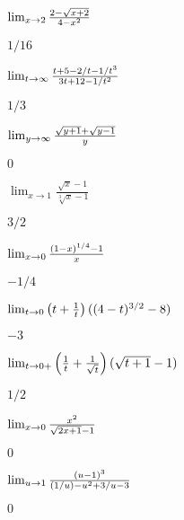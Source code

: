 \begin{exercises}
\begin{exercise} $\lim_{x\to2}{2-\sqrt{x+2}\over 4-x^2}$
\begin{answer} $1/16$
\end{answer}\end{exercise}

\begin{exercise} $\lim_{t\to\infty}{t+5-2/t-1/t^3\over 3t+12-1/t^2}$
\begin{answer} $1/3$
\end{answer}\end{exercise}

\begin{exercise} $\lim_{y\to\infty}{\sqrt{y+1}+\sqrt{y-1}\over y}$
\begin{answer} $0$
\end{answer}\end{exercise}

\begin{exercise} $\lim_{x\to1}\frac{\sqrt{x}-1}{\sqrt[3]{x}-1}$
\begin{answer} $3/2$
\end{answer}\end{exercise}

\begin{exercise} $\lim_{x\to0}{(1-x)^{1/4}-1\over x}$
\begin{answer} $-1/4$
\end{answer}\end{exercise}

\begin{exercise} $\lim_{t\to 0}{\left(t+{1\over t}\right)((4-t)^{3/2}-8)}$
\begin{answer} $-3$
\end{answer}\end{exercise}

\begin{exercise} $\lim_{t\to 0+}\left({1\over t}+{1\over\sqrt{t}}\right)
(\sqrt{t+1}-1)$
\begin{answer} $1/2$
\end{answer}\end{exercise}

\begin{exercise} $\lim_{x\to 0}{x^2\over\sqrt{2x+1}-1}$
\begin{answer} $0$
\end{answer}\end{exercise}

\begin{exercise} $\lim_{u\to 1}{(u-1)^3\over (1/u)-u^2+3/u-3}$
\begin{answer} $0$
\end{answer}\end{exercise}


\end{exercises}

